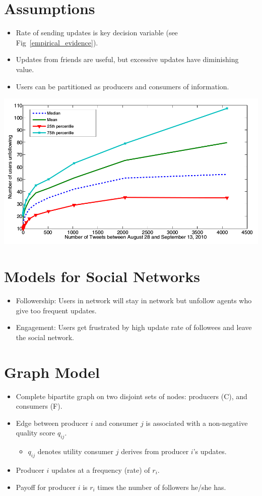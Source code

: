 \documentclass[8pt]{article}
\newcommand{\bi}{\begin{itemize}}
\newcommand{\ei}{\end{itemize}}
\begin{document}
\section{Assumptions}
\begin{multicols}{2}
\bi
\item Rate of sending updates is key decision variable (see
    Fig~\ref{empirical_evidence}).
\item Updates from friends are useful, but excessive updates have diminishing
    value.
\item Users can be partitioned as producers and consumers of information.
\ei
\columnbreak
\begingroup
%    
    \includegraphics[scale=0.25]{./figures/twitter_data.png}
    \label{empirical_evidence}
\endgroup
\end{multicols}
\section{Models for Social Networks}
\bi
\item Followership: Users in network will stay in network but unfollow agents
    who give too frequent updates.
\item Engagement: Users get frustrated by high update rate of followees and
    leave the social network.
\ei

\section{Graph Model}
    \bi
\item Complete bipartite graph on two disjoint sets of nodes: producers (C), and
    consumers (F).
\item Edge between producer $i$ and consumer $j$ is associated with a non-negative
    quality score $q_{ij}$.
    \bi
\item $q_{ij}$ denotes utility consumer $j$ derives from producer $i$'s updates.
    \ei
\item Producer $i$ updates at a frequency (rate) of $r_{i}$.
\item Payoff for producer $i$ is $r_i$ times the number of followers he/she has.
    \ei
\end{document}
